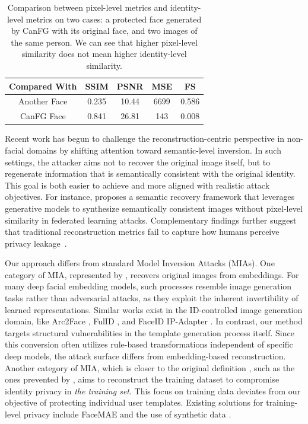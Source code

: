 \begin{table}
    \centering
        \caption{Comparison between pixel-level metrics and identity-level metrics on two cases: a protected face generated by CanFG with its original face, and two images of the same person. We can see that higher pixel-level similarity does not mean higher identity-level similarity. }
    \label{tab:canfg}
    
    \begin{tabular}{c|cccc}
    \toprule
         Compared With &  SSIM&  PSNR&  MSE& FS\\
         \midrule
         Another Face&  0.235&  10.44&  6699& 0.586\\
         CanFG Face&  0.841&  26.81&  143& 0.008\\
         \bottomrule
    \end{tabular}
\end{table}

Recent work has begun to challenge the reconstruction-centric perspective in non-facial domains by shifting attention toward semantic-level inversion. In such settings, the attacker aims not to recover the original image itself, but to regenerate information that is semantically consistent with the original identity. This goal is both easier to achieve and more aligned with realistic attack objectives. For instance, \citet{yue_gradient_2023} proposes a semantic recovery framework that leverages generative models to synthesize semantically consistent images without pixel-level similarity in federated learning attacks. Complementary findings further suggest that traditional reconstruction metrics fail to capture how humans perceive privacy leakage~\cite{sun_privacy_2023}. 

Our approach differs from standard Model Inversion Attacks (MIAs). One category of MIA, represented by \citet{wang_diffusion-driven_2025}, recovers original images from embeddings. For many deep facial embedding models, such processes resemble image generation tasks rather than adversarial attacks, as they exploit the inherent invertibility of learned representations. Similar works exist in the ID-controlled image generation domain, like Arc2Face \cite{papantoniou_arc2face_2024}, FulID \cite{guo_pulid_2024}, and FaceID IP-Adapter \cite{ye_ip-adapter_2023}. In contrast, our method targets structural vulnerabilities in the template generation process itself. Since this conversion often utilizes rule-based transformations independent of specific deep models, the attack surface differs from embedding-based reconstruction. Another category of MIA, which is closer to the original definition \cite{fredrikson_model_2015}, such as the ones prevented by \citet{wang_adaptive_2024}, aims to reconstruct the training dataset to compromise identity privacy in \textit{the training set}. This focus on training data deviates from our objective of protecting individual user templates. Existing solutions for training-level privacy include FaceMAE \cite{wang_facemae_2022} and the use of synthetic data \cite{bae_digiface-1m_2022}. 





